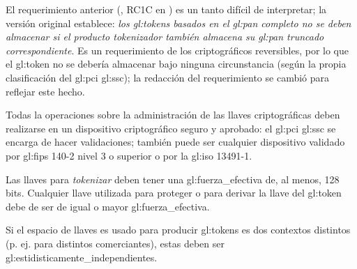 El requerimiento anterior (,
RC1C en \cite{pci_tokens}) es un tanto difícil de interpretar; la versión
original establece: \textit{los \glspl{gl:token} basados en el \gls{gl:pan}
completo no se deben almacenar si el producto tokenizador también almacena
su \gls{gl:pan} truncado correspondiente}. Es un requerimiento de los
criptográficos reversibles, por lo que el \gls{gl:token} no se debería
almacenar bajo ninguna circunstancia (según la propia clasificación del
\gls{gl:pci} \gls{gl:ssc}); la redacción del requerimiento se cambió para
reflejar este hecho.

{
  Todas la operaciones sobre la administración de las llaves criptográficas
  deben realizarse en un dispositivo criptográfico seguro y aprobado: el
  \gls{gl:pci} \gls{gl:ssc} se encarga de hacer validaciones; también puede ser
  cualquier dispositivo validado por \gls{gl:fips} 140-2 nivel 3 o superior
  \cite{nist_modulos_criptograficos} o por la \gls{gl:iso} 13491-1.
}

{
  Las llaves para \textit{tokenizar} deben tener una
  \gls{gl:fuerza_efectiva} de, al menos, 128 bits. Cualquier llave utilizada
  para proteger o para derivar la llave del \gls{gl:token} debe de ser de igual
  o mayor \gls{gl:fuerza_efectiva}.
}

{
  Si el espacio de llaves es usado para producir \glspl{gl:token} es dos
  contextos distintos (p. ej. para distintos comerciantes), estas deben ser
  \glspl{gl:estidisticamente_independiente}.
}
